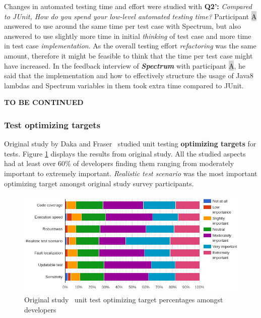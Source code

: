 Changes in automated testing time and effort were studied with \textbf{Q2':} \textit{Compared to JUnit, How do you spend your low-level automated testing time?}
Participant {\colorbox{lightgray}A} answered
to use around the same time per test case with Spectrum, but also answered to use slightly more time in initial \textit{thinking} of test
case and more time in test case \textit{implementation}. As the overall testing effort \textit{refactoring} was the same amount, therefore it might
be feasible to think that the time per test case might have increased. In the feedback interview of \textbf{\textit{Spectrum}} with participant
{\colorbox{lightgray}A}, he said that the implementation and how to effectively structure the usage of Java8 lambdas and Spectrum variables
in them took extra time compared to JUnit.

\textbf{TO BE CONTINUED}
\clearpage

\subsubsection{Test optimizing targets}
Original study by Daka and Fraser~\cite{daka2014survey} studied unit testing \textbf{optimizing targets} for tests. Figure \ref{fig:org-optimize}
displays the results from original study. All the studied aspects had at least over 60\% of developers finding them ranging
from moderately important to extremely important. \textit{Realistic test scenario} was the most important optimizing target
amongst original study survey participants.

    \begin{figure}[ht]
      \begin{center}
        \includegraphics[width=14.7cm]{images/optimize-org.png}
        \caption{Original study~\cite{daka2014survey} unit test optimizing target percentages amongst developers}
        \label{fig:org-optimize}
      \end{center}
    \end{figure}

